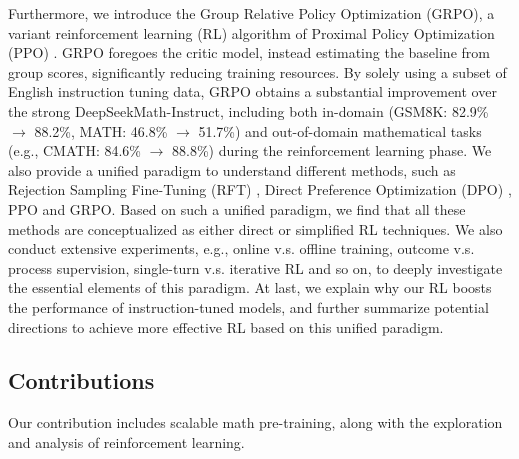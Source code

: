 Furthermore, we introduce the Group Relative Policy Optimization (GRPO), a variant reinforcement learning (RL) algorithm of Proximal Policy Optimization (PPO) \citep{schulman2017proximal}.
GRPO foregoes the critic model, instead estimating
the baseline from group scores, significantly reducing training resources.
By solely using a subset of English instruction tuning data, GRPO obtains a substantial improvement over the strong DeepSeekMath-Instruct, including both in-domain (GSM8K: 82.9\% $\rightarrow$ 88.2\%, MATH: 46.8\% $\rightarrow$ 51.7\%) and out-of-domain mathematical tasks (e.g., CMATH: 84.6\% $\rightarrow$ 88.8\%) during the reinforcement learning phase.
We also provide a unified paradigm to understand different methods, such as Rejection Sampling Fine-Tuning (RFT) \citep{yuan2023scaling}, Direct Preference Optimization (DPO) \citep{dpo}, PPO and GRPO.
Based on such a unified paradigm, we find that all these methods are conceptualized as either direct or simplified RL techniques. 
We also conduct extensive experiments, e.g., online v.s. offline training, outcome v.s. process supervision, single-turn v.s. iterative RL and so on, to deeply investigate the essential elements of this paradigm.
At last, we explain why our RL boosts the performance of instruction-tuned models, and further summarize potential directions to achieve more effective RL based on this unified paradigm.

\subsection{Contributions}
Our contribution includes scalable math pre-training, along with the exploration and analysis of reinforcement learning.

